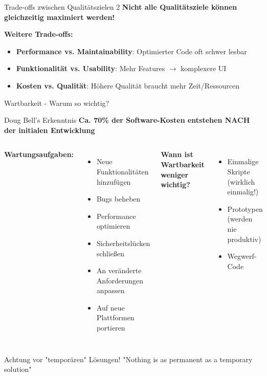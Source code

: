 \begin{frame}{Trade-offs zwischen Qualitätszielen 2}
  \textbf{Nicht alle Qualitätsziele können gleichzeitig maximiert werden!}

  \textbf{Weitere Trade-offs:}
  \begin{itemize}
    \item \textbf{Performance vs. Maintainability}: Optimierter Code oft schwer lesbar
    \item \textbf{Funktionalität vs. Usability}: Mehr Features $\rightarrow$ komplexere UI
    \item \textbf{Kosten vs. Qualität}: Höhere Qualität braucht mehr Zeit/Ressourcen
  \end{itemize}
\end{frame}

\begin{frame}{Wartbarkeit - Warum so wichtig?}
  \begin{exampleblock}{Doug Bell's Erkenntnis}
    \textbf{Ca. 70\% der Software-Kosten entstehen NACH der initialen Entwicklung}
  \end{exampleblock}

  \begin{columns}[T]
    \textbf{Wartungsaufgaben:}
    \begin{itemize}
      \item Neue Funktionalitäten hinzufügen
      \item Bugs beheben
      \item Performance optimieren
      \item Sicherheitslücken schließen
      \item An veränderte Anforderungen anpassen
      \item Auf neue Plattformen portieren
    \end{itemize}

    \textbf{Wann ist Wartbarkeit weniger wichtig?}
    \begin{itemize}
      \item Einmalige Skripte (wirklich einmalig!)
      \item Prototypen (werden nie produktiv)
      \item Wegwerf-Code
    \end{itemize}
  \end{columns}

  \begin{alertblock}{Achtung vor "temporären" Lösungen!}
    "Nothing is as permanent as a temporary solution"
  \end{alertblock}
\end{frame}

